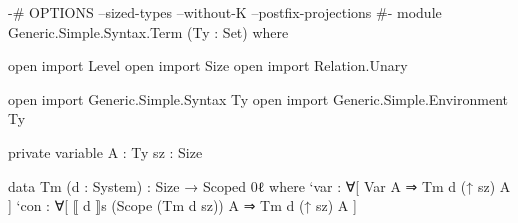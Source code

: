 \begin{code}
{-# OPTIONS --sized-types --without-K --postfix-projections #-}
module Generic.Simple.Syntax.Term (Ty : Set) where

  open import Level
  open import Size
  open import Relation.Unary

  open import Generic.Simple.Syntax Ty
  open import Generic.Simple.Environment Ty

  private
    variable
      A : Ty
      sz : Size

  data Tm (d : System) : Size → Scoped 0ℓ where
    `var : ∀[ Var                      A ⇒ Tm d (↑ sz) A ]
    `con : ∀[ ⟦ d ⟧s (Scope (Tm d sz)) A ⇒ Tm d (↑ sz) A ]
\end{code}
